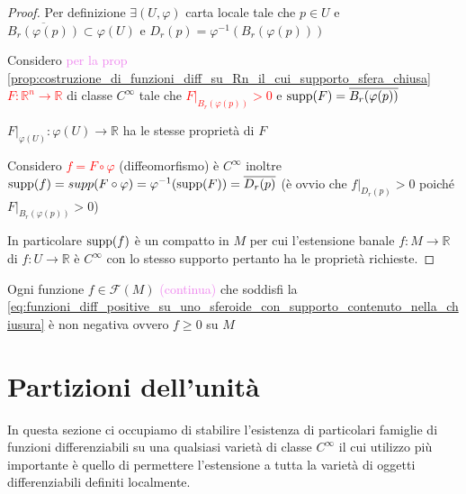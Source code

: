         \begin{proof}
        \mbox{}

        Per definizione $\exists (U, \varphi)$ carta locale tale che $p \in U$ e $\overline{B_r(\varphi(p))} \subset \varphi(U)$ e $D_r(p)=\varphi^{-1}(B_r(\varphi(p)))$

        Considero \textcolor{violet}{per la prop \ref{prop:costruzione_di_funzioni_diff_su_Rn_il_cui_supporto_sfera_chiusa}} 
        \textcolor{red}{$F \colon \mathbb{R}^n \to \mathbb{R}$} di classe $C^\infty$ tale che \textcolor{red}{$F|_{B_r(\varphi(p))}>0$} e 
        \textcolor{red}{$\operatorname{supp}(F) = \overline{B_r(\varphi(p))}$} 

        \textcolor{blu}{$F|_{\varphi(U)} \colon \varphi(U) \to \mathbb{R}$ ha le stesse proprietà di $F$}

        Considero \textcolor{red}{$f = F \circ \varphi$} \textcolor{blu}{(diffeomorfismo)} è $C^\infty$
        inoltre $\operatorname{supp}(f)=supp(F \circ \varphi)=\varphi^{-1}(\operatorname{supp}(F)) = \overline{D_r(p)}$ \textcolor{blu}{(è ovvio che $f|_{D_r(p)}>0$
        poiché $F|_{B_r(\varphi(p))}>0$)}

        In particolare $\operatorname{supp}(f)$ è un compatto in $M$ per cui l'estensione banale 
        $f \colon M \to \mathbb{R}$ di $f \colon U \to \mathbb{R}$ è $C^\infty$ con lo stesso supporto pertanto ha le proprietà richieste.
        \end{proof}
        \begin{osservazione}
        Ogni funzione $f \in \mathcal{F}(M)$ \textcolor{violet}{(continua)} che soddisfi la
        \eqref{eq:funzioni_diff_positive_su_uno_sferoide_con_supporto_contenuto_nella_chiusura} è non negativa ovvero
        $f \geq 0$ su $M$
        \end{osservazione}
    \section{Partizioni dell'unità}
        In questa sezione ci occupiamo di stabilire l'esistenza di particolari famiglie di funzioni differenziabili su una qualsiasi varietà di classe $C^{\infty}$ il cui utilizzo più importante è quello di permettere l'estensione a tutta la varietà di oggetti differenziabili definiti localmente.

